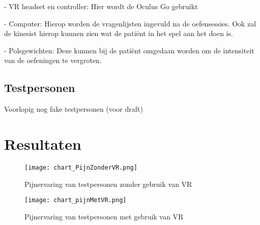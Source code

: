 - VR headset en controller: Hier wordt de Oculus Go gebruikt

- Computer: Hierop worden de vragenlijsten ingevuld na de oefensessies. Ook zal de kinesist hierop kunnen zien wat de patiënt in het spel aan het doen is.

- Polsgewichten: Deze kunnen bij de patiënt omgedaan worden om de intensiteit van de oefeningen te vergroten.


\subsection{Testpersonen}
Voorlopig nog fake testpersonen (voor draft)

\section{Resultaten}

\begin{figure}[h]
    \centering
    \texttt{[image: chart\_PijnZonderVR.png]}
    \caption{Pijnervaring van testpersonen zonder gebruik van VR}
\end{figure}

\begin{figure}[h]
    \centering
    \texttt{[image: chart\_pijnMetVR.png]}
    \caption{Pijnervaring van testpersonen met gebruik van VR}
\end{figure}




